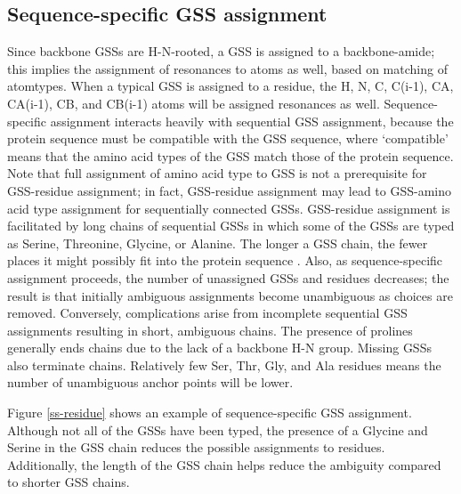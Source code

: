 \subsection*{Sequence-specific GSS assignment}
Since backbone GSSs are H-N-rooted, a GSS is assigned to a 
backbone-amide; this implies the assignment of resonances to atoms as well, 
based on matching of atomtypes.  When a typical GSS is assigned to a residue, 
the H, N, C, C(i-1), CA, CA(i-1), CB, and CB(i-1) atoms will be assigned 
resonances as well.  Sequence-specific assignment interacts heavily with 
sequential GSS assignment, because the protein sequence must be compatible 
with the GSS sequence, where `compatible' means that the amino acid types 
of the GSS match those of the protein sequence.  Note that full assignment 
of amino acid type to GSS is not a prerequisite for GSS-residue assignment; 
in fact, GSS-residue assignment may lead to GSS-amino acid type assignment 
for sequentially connected GSSs.  GSS-residue assignment is facilitated by 
long chains of sequential GSSs in which some of the GSSs are typed as Serine, 
Threonine, Glycine, or Alanine.  The longer a GSS chain, the fewer places it 
might possibly fit into the protein sequence \cite{saga}.  Also, 
as sequence-specific assignment proceeds, the number of unassigned GSSs and 
residues decreases; the result is that initially ambiguous assignments become 
unambiguous as choices are removed.  Conversely, complications arise from 
incomplete sequential GSS assignments resulting in short, ambiguous chains.  
The presence of prolines generally ends chains due to the lack of a backbone 
H-N group.  Missing GSSs also terminate chains.  Relatively few Ser, Thr, Gly, 
and Ala residues means the number of unambiguous anchor points will be lower.

Figure \ref{ss-residue} shows an example of sequence-specific GSS assignment.
Although not all of the GSSs have been typed, the presence of a Glycine and
Serine in the GSS chain reduces the possible assignments to residues.
Additionally, the length of the GSS chain helps reduce the ambiguity compared
to shorter GSS chains.

